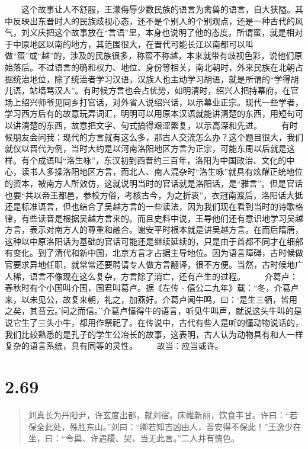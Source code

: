 \documentclass[]{book}
\begin{document}
　　这个故事让人不舒服，王濛侮辱少数民族的语言为禽兽的语言，自大狭隘。其中反映出东晋时人的民族歧视心态，还不是个别人的个别观点，还是一种古代的风气，刘义庆把这个故事放在``言语''里，本身也说明了他的态度。所谓蛮，就是相对于中原地区以南的地方，其范围很大，在晋代可能长江以南都可以叫做``蛮''或``越''的，涉及的民族很多，称蛮不称越，本来就带有歧视色彩，说他们原始落后。不过语言的确和权力、地位、身份等相关，南北朝时，外来民族在北朝占据统治地位，除了统治者学习汉语，汉族人也主动学习胡语，就是所谓的``学得胡儿语，站墙骂汉人''。有时候方言也会占优势，如明清时，绍兴人把持幕府，在官场上绍兴师爷见同乡打官话，对外省人说绍兴话，以示幕业正宗。现代一些学者，学习西方后有的故意玩弄词汇，明明可以用原本汉语就能讲清楚的东西，用短句可以讲清楚的东西，故意把文字、句式搞得艰涩繁复，以示高深和先进。
　　有时候朋友会问我：现代的方言就有这么多，那古人交流怎么办？这个题目很大，我们就仅以晋代为例，当时大约是以河南洛阳地区方言为正宗，可能东周以后就是这样。有个成语叫``洛生咏''，东汉初到西晋约三百年，洛阳为中国政治、文化的中心，读书人多操洛阳地区方言，而北人、南人混杂时``洛生咏''就具有炫耀正统地位的资本，被南方人所效仿，这就说明当时的官话就是洛阳话，是``雅言''。但是官话也要``共以帝王都邑，参校方俗，考核古今，为之折衷''，衣冠南渡后，洛阳话大抵还是标准语言，但也结合了吴越方言的一些读法，因为我们现在看到当时的诗歌格律，有些读音是根据吴越方言来的。而且史料中说，王导他们还有意识地学习吴越方言，表示对南方人的尊重和融合。谢安平时根本就是讲吴越方言。在而后隋唐，这种以中原洛阳话为基础的官话可能还是继续延续的，只是由于首都不同才在细部有变化。到了清代和新中国，北京方言才占据主导地位。因为语言障碍，古时候做官要求异地任职，就常常还要聘请专人做方言翻译，很不方便。当然，古时候地广人稀，语言不像现在这么复杂，方言除了消亡，还有产生的过程。
　　介葛卢：春秋时有个小国叫介国，国君叫葛卢。据《左传 -
僖公二九年》载：``冬，介葛卢来，以未见公，故复来朝，礼之，加燕好。介葛卢闻牛鸣，曰：`是生三牺，皆用之矣，其音云。'问之而信。''介葛卢懂得牛的语言，听见牛叫声，就说这头牛叫的是说它生了三头小牛，都用作祭祀了。在传说中，古代有些人是听的懂动物说话的，我们比较熟悉的是孔子的学生公冶长的故事，这表明，古人认为动物具有和人一样复杂的语言系统，具有同等的灵性。
　　故当：应当或许。　

\section{2.69}\label{section-115}

\begin{quote}
刘真长为丹阳尹，许玄度出都，就刘宿。床帷新丽，饮食丰甘。许曰：``若保全此处，殊胜东山。''刘曰：``卿若知吉凶由人，吾安得不保此！''王逸少在坐，曰：``令巢、许遇稷、契，当无此言。''二人并有愧色。
\end{quote}
\end{document}
